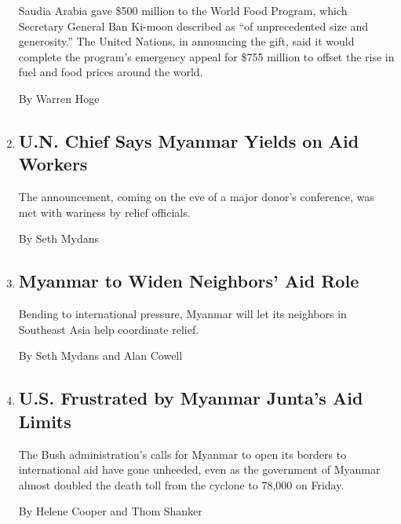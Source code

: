 \begin{enumerate}
  Saudia Arabia gave \$500 million to the World Food Program, which
  Secretary General Ban Ki-moon described as ``of unprecedented size and
  generosity.'' The United Nations, in announcing the gift, said it
  would complete the program's emergency appeal for \$755 million to
  offset the rise in fuel and food prices around the world.

  By Warren Hoge
\item
  \href{/2008/05/24/world/asia/24myanmar.html}{}

  \hypertarget{un-chief-says-myanmar-yields-on-aid-workers}{%
  \subsection{U.N. Chief Says Myanmar Yields on Aid
  Workers}\label{un-chief-says-myanmar-yields-on-aid-workers}}

  The announcement, coming on the eve of a major donor's conference, was
  met with wariness by relief officials.

  By Seth Mydans
\item
  \href{/2008/05/20/world/asia/20myanmar.html}{}

  \hypertarget{myanmar-to-widen-neighbors-aid-role}{%
  \subsection{Myanmar to Widen Neighbors' Aid
  Role}\label{myanmar-to-widen-neighbors-aid-role}}

  Bending to international pressure, Myanmar will let its neighbors in
  Southeast Asia help coordinate relief.

  By Seth Mydans and Alan Cowell
\item
  \href{/2008/05/17/world/asia/17aid.html}{}

  \hypertarget{us-frustrated-by-myanmar-juntas-aid-limits}{%
  \subsection{U.S. Frustrated by Myanmar Junta's Aid
  Limits}\label{us-frustrated-by-myanmar-juntas-aid-limits}}

  The Bush administration's calls for Myanmar to open its borders to
  international aid have gone unheeded, even as the government of
  Myanmar almost doubled the death toll from the cyclone to 78,000 on
  Friday.

  By Helene Cooper and Thom Shanker
\end{enumerate}

